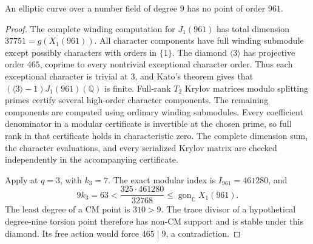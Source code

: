 \begin{proposition}\label{prop:nonic-no961}
An elliptic curve over a number field of degree $9$ has no point of order $961$.
\end{proposition}
\begin{proof}
The complete winding computation for $J_1(961)$ has total dimension
$37751=g(X_1(961))$. All character components have full winding submodule
except possibly characters with orders in
$\{1\}$.
The diamond $\langle3\rangle$ has projective order $465$, coprime
to every nontrivial exceptional character order. Thus each exceptional
character is trivial at $3$, and Kato's theorem gives that
$(\langle3\rangle-1)J_1(961)(\mathbb Q)$ is finite.
Full-rank $T_2$ Krylov matrices modulo splitting primes certify several
high-order character components. The remaining components are computed
using ordinary winding submodules. Every coefficient denominator in a
modular certificate is invertible at the chosen prime, so full rank
in that certificate holds in characteristic zero.
The complete dimension sum, the character evaluations, and every serialized
Krylov matrix are checked independently in the accompanying certificate.

Apply \cite[Proposition~4.4]{DN} at $q=3$, with $k_3=7$.
The exact modular index is $I_{961}=461280$, and
\[
 9k_3=63<\frac{325\cdot461280}{32768}
       \leq\operatorname{gon}_{\mathbb C}X_1(961).
\]
The least degree of a CM point is $310>9$.
The trace divisor of a hypothetical degree-nine torsion point therefore
has non-CM support and is stable under this diamond.
Its free action would force $465\mid9$, a contradiction.
\end{proof}
